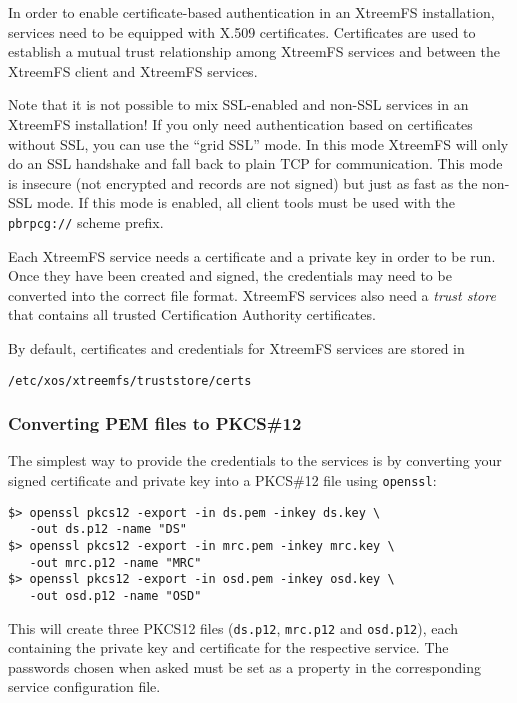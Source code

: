 \documentclass[a4paper,10pt]{book}
\begin{document}
In order to enable certificate-based authentication in an XtreemFS installation, services need to be equipped with X.509 certificates. Certificates are used to establish a mutual trust relationship among XtreemFS services and between the XtreemFS client and XtreemFS services.

Note that it is not possible to mix SSL-enabled and non-SSL services in an XtreemFS installation! If you only need authentication based on certificates without SSL, you can use the ``grid SSL'' mode. In this mode XtreemFS will only do an SSL handshake and fall back to plain TCP for communication. This mode is insecure (not encrypted and records are not signed) but just as fast as the non-SSL mode. If this mode is enabled, all client tools must be used with the \texttt{pbrpcg://} scheme prefix.

Each XtreemFS service needs a certificate and a private key in order to be run. Once they have been created and signed, the credentials may need to be converted into the correct file format. XtreemFS services also need a \textit{trust store} that contains all trusted Certification Authority certificates.

By default, certificates and credentials for XtreemFS services are stored in
\begin{verbatim}
/etc/xos/xtreemfs/truststore/certs
\end{verbatim}


\subsubsection{Converting PEM files to PKCS\#12}
The simplest way to provide the credentials to the services is by converting your signed certificate and private key into a PKCS\#12 file using \texttt{openssl}:


\begin{verbatim}
$> openssl pkcs12 -export -in ds.pem -inkey ds.key \
   -out ds.p12 -name "DS"
$> openssl pkcs12 -export -in mrc.pem -inkey mrc.key \
   -out mrc.p12 -name "MRC"
$> openssl pkcs12 -export -in osd.pem -inkey osd.key \
   -out osd.p12 -name "OSD"
\end{verbatim}


This will create three PKCS12 files (\texttt{ds.p12}, \texttt{mrc.p12} and \texttt{osd.p12}), each containing the private key and certificate for the respective service. The passwords chosen when asked must be set as a property in the corresponding service configuration file.
\end{document}
